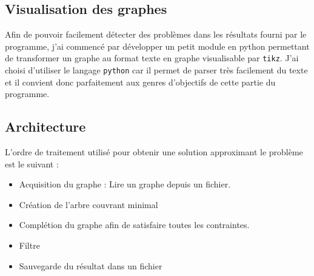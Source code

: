 \documentclass[a4paper,12pt]{article}
\begin{document}
\subsection{Visualisation des graphes}
Afin de pouvoir facilement détecter des problèmes dans les résultats fourni
par le programme, j'ai commencé par développer un petit module en python
permettant de transformer un graphe au format texte en graphe visualisable
par \verb!tikz!.
J'ai choisi d'utiliser le langage \verb!python! car il permet de parser très
facilement du texte et il convient donc parfaitement aux genres d'objectifs
de cette partie du programme.


\begin{figure}[H]
  \centering
\end{figure}

\subsection{Architecture}
L'ordre de traitement utilisé pour obtenir une solution approximant
le problème est le suivant :

\begin{itemize}
\item Acquisition du graphe : Lire un graphe depuis un fichier.
\item Création de l'arbre couvrant minimal
\item Complétion du graphe afin de satisfaire toutes les contraintes.
\item Filtre
\item Sauvegarde du résultat dans un fichier
\end{itemize}
\end{document}
